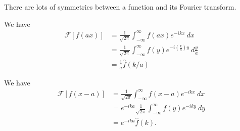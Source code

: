 \documentclass[10pt]{mypackage}
\begin{document}
There are lots of symmetries between a function and its Fourier transform.
\begin{example}[Scaling]
  We have
  \begin{align*}
    \mathcal{F}\left[f(ax)\right] &= \frac{1}{\sqrt{2\pi}}\int_{-\infty}^{\infty} f(ax)e^{-ikx}\:dx\\
                                  &= \frac{1}{\sqrt{2\pi}}\int_{-\infty}^{\infty} f(y)e^{-i\left(\frac{k}{a}\right)y}\:d\frac{y}{a}\tag*{$y = ax$}\\
                                  &= \frac{1}{a}\widehat{f}\left(k/a\right)
  \end{align*}
\end{example}
\begin{example}[Translation]
  We have
  \begin{align*}
    \mathcal{F}\left[f(x-a)\right] &= \frac{1}{\sqrt{2\pi}}\int_{-\infty}^{\infty} f\left(x-a\right)e^{-ikx}\:dx\\
                                   &= e^{-ika}\frac{1}{\sqrt{2\pi}}\int_{-\infty}^{\infty} f\left(y\right)e^{-iky}\:dy\\
                                   &= e^{-ika}\widehat{f}(k).
  \end{align*}
  
\end{example}
\end{document}
